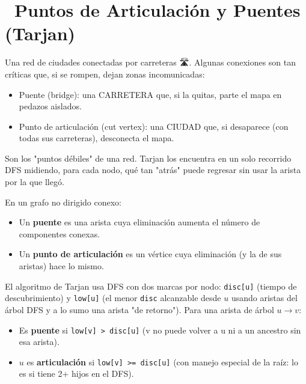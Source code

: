 \chapter[\emj{🌁}~Puntos de Articulación y Puentes (Tarjan)]{~Puntos de Articulación y Puentes (Tarjan)}

\begin{dsaquees}

Una red de ciudades conectadas por carreteras 🛣️. Algunas conexiones
son tan críticas que, si se rompen, dejan zonas incomunicadas:

\begin{itemize}
\item Puente (bridge): una CARRETERA que, si la quitas, parte el mapa en
      pedazos aislados.
\item Punto de articulación (cut vertex): una CIUDAD que, si desaparece
      (con todas sus carreteras), desconecta el mapa.
\end{itemize}

Son los "puntos débiles" de una red. Tarjan los encuentra en un solo
recorrido DFS midiendo, para cada nodo, qué tan "atrás" puede regresar
sin usar la arista por la que llegó.

\end{dsaquees}

\begin{dsaotraforma}

En un grafo no dirigido conexo:
\begin{itemize}
\item Un \textbf{puente} es una arista cuya eliminación aumenta el número
      de componentes conexas.
\item Un \textbf{punto de articulación} es un vértice cuya eliminación
      (y la de sus aristas) hace lo mismo.
\end{itemize}

El algoritmo de Tarjan usa DFS con dos marcas por nodo:
\verb|disc[u]| (tiempo de descubrimiento) y \verb|low[u]| (el menor
\verb|disc| alcanzable desde $u$ usando aristas del árbol DFS y a lo
sumo una arista "de retorno"). Para una arista de árbol $u \to v$:
\begin{itemize}
\item Es \textbf{puente} si \verb|low[v] > disc[u]| (v no puede volver a
      u ni a un ancestro sin esa arista).
\item $u$ es \textbf{articulación} si \verb|low[v] >= disc[u]| (con
      manejo especial de la raíz: lo es si tiene 2+ hijos en el DFS).
\end{itemize}

\end{dsaotraforma}

